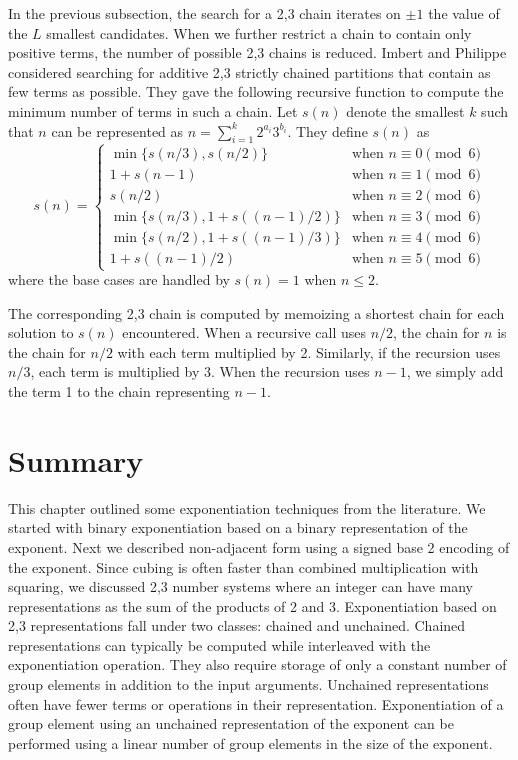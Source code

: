 \documentclass{ucalgthes1}
\theoremstyle{definition}
\begin{document}
In the previous subsection, the search for a 2,3 chain iterates on $\pm 1$ the value of the $L$ smallest candidates.  When we further restrict a chain to contain only positive terms, the number of possible 2,3 chains is reduced.  Imbert and Philippe \cite[\S 3]{Imbert2010b} considered searching for additive 2,3 strictly chained partitions that contain as few terms as possible.  They gave the following recursive function to compute the minimum number of terms in such a chain.  Let $s(n)$ denote the smallest $k$ such that $n$ can be represented as $n = \sum_{i=1}^k 2^{a_i} 3^{b_i}$.  They define $s(n)$ as
\begin{equation*}
s(n) = \begin{cases}
	\min\{s(n/3), s(n/2)\} & \textrm{when } n \equiv 0 \pmod 6 \\
	1 + s(n-1) & \textrm{when } n \equiv 1 \pmod 6 \\
	s(n/2) & \textrm{when } n \equiv 2 \pmod 6 \\
	\min\{s(n/3), 1 + s((n-1)/2)\} & \textrm{when } n \equiv 3 \pmod 6 \\ 
	\min\{s(n/2), 1 + s((n-1)/3)\} & \textrm{when } n \equiv 4 \pmod 6 \\
	1 + s((n-1)/2) & \textrm{when } n \equiv 5 \pmod 6
\end{cases}
\end{equation*}
where the base cases are handled by $s(n) = 1$ when $n \le 2$.

The corresponding 2,3 chain is computed by memoizing a shortest chain for each solution to $s(n)$ encountered. When a recursive call uses $n/2$, the chain for $n$ is the chain for $n/2$ with each term multiplied by 2.  Similarly, if the recursion uses $n/3$, each term is multiplied by 3.  When the recursion uses $n-1$, we simply add the term 1 to the chain representing $n-1$.


\section{Summary}

This chapter outlined some exponentiation techniques from the literature.  We started with binary exponentiation based on a binary representation of the exponent.  Next we described non-adjacent form using a signed base 2 encoding of the exponent.  Since cubing is often faster than combined multiplication with squaring, we discussed 2,3 number systems where an integer can have many representations as the sum of the products of 2 and 3.  Exponentiation based on 2,3 representations fall under two classes: chained and unchained.  Chained representations can typically be computed while interleaved with the exponentiation operation.  They also require storage of only a constant number of group elements in addition to the input arguments.  Unchained representations often have fewer terms or operations in their representation.  Exponentiation of a group element using an unchained representation of the exponent can be performed using a linear number of group elements in the size of the exponent.
\end{document}

